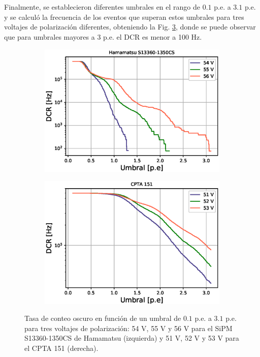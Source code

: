 \\ \\
Finalmente, se establecieron diferentes umbrales en el rango de $0.1$ p.e. a $3.1$ p.e. y se calculó la frecuencia de los eventos que superan estos umbrales para tres voltajes de polarización diferentes, obteniendo la Fig. \ref{fig:DCR_vs_th}, donde se puede observar que para umbrales mayores a 3 p.e. el DCR es menor a 100 Hz.  
\begin{figure}[h!]
     \centering
     \begin{subfigure}[b]{0.49\textwidth}
         \centering
         \includegraphics[width=1.1\textwidth]{Images/DCR_vs_th_1350CS.eps}
         \caption{}
         \label{fig:DCR_vs_th_1}
     \end{subfigure}
     \begin{subfigure}[b]{0.49\textwidth}
         \centering
         \includegraphics[width=1.1\textwidth]{Images/DCR_vs_th_CPTA.eps}
         \caption{}
         \label{fig:DCR_vs_th_2}
     \end{subfigure}
        \caption{Tasa de conteo oscuro en función de un umbral de $0.1$ p.e. a $3.1$ p.e. para tres voltajes de polarización: 54 V, 55 V y 56 V para el SiPM S13360-1350CS de Hamamatsu (izquierda) y 51 V, 52 V y 53 V para el CPTA 151 (derecha).}
        \label{fig:DCR_vs_th}
\end{figure}
